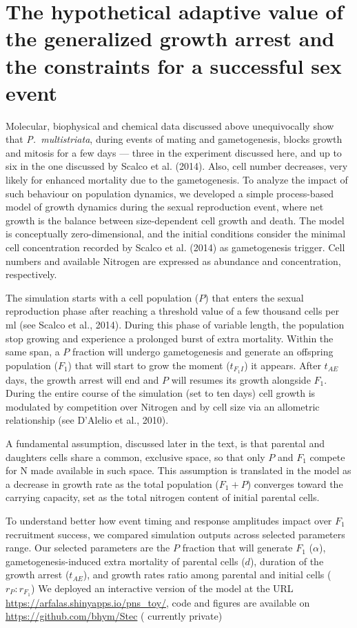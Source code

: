 \documentclass[a4paper,oneside]{article}
\begin{document}
  \section*{The hypothetical adaptive value of the generalized growth arrest and the constraints for a successful sex event}
    Molecular, biophysical and chemical data discussed above unequivocally show that \textit{P.~multistriata}, during events of mating and gametogenesis, blocks growth and mitosis for a few days --- three in the experiment discussed here, and up to six in the one discussed by Scalco et al. (2014).
    Also, cell number decreases, very likely for enhanced mortality due to the gametogenesis.
    To analyze the impact of such behaviour on population dynamics, we developed a simple process-based model of growth dynamics during the sexual reproduction event, where net growth is the balance between size-dependent cell growth and death.
    The model is conceptually zero-dimensional, and the initial conditions consider the minimal cell concentration recorded by Scalco et al. (2014) as gametogenesis trigger.
    Cell numbers and available Nitrogen are expressed as abundance and concentration, respectively.

    The simulation starts with a cell population ($P$) that enters the sexual reproduction phase after reaching a threshold value of a few thousand cells per ml (see Scalco et al., 2014).
    During this phase of variable length, the population stop growing and experience a prolonged burst of extra mortality.
    Within the same span, a $P$ fraction will undergo gametogenesis and generate an offspring population ($F_{1}$) that will start to grow the moment ($t_{F_{1}I}$) it appears.
    After $t_{AE}$ days, the growth arrest will end and $P$ will resumes its growth alongside $F_{1}$.
    During the entire course of the simulation (set to ten days) cell growth is modulated by competition over Nitrogen and by cell size via an allometric relationship (see D'Alelio et al., 2010).

    A fundamental assumption, discussed later in the text, is that parental and daughters cells share a common, exclusive space, so that only $P$ and $F_{1}$ compete for N made available in such space.
    This assumption is translated in the model as a decrease in growth rate as the total population ($F_{1} + P$) converges toward the carrying capacity, set as the total nitrogen content of initial parental cells.

    To understand better how event timing and response amplitudes impact over $F_{1}$ recruitment success, we compared simulation outputs across selected parameters range.
    Our selected parameters are the $P$ fraction that will generate $F_{1}$ ($\alpha$), gametogenesis-induced extra mortality of parental cells ($d$), duration of the growth arrest ($t_{AE}$), and growth rates ratio among parental and initial cells ($r_{P}:r_{F_{1}}$)
    We deployed an interactive version of the model at the URL \url{https://arfalas.shinyapps.io/pns_toy/}, code and figures are available on \url{https://github.com/bhym/Stec} ({\color{red} currently private})
%
\end{document}
